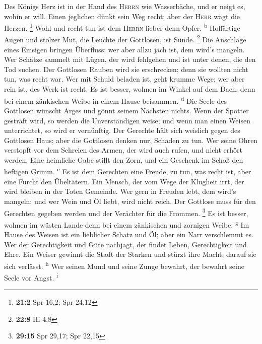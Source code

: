  Des Königs Herz ist in der Hand des \textsc{Herrn} wie
Wasserbäche, und er neigt es, wohin er will.  Einen
jeglichen dünkt sein Weg recht; aber der \textsc{Herr} wägt die Herzen.
\footnote{\textbf{21:2} Spr 16,2; Spr 24,12}  Wohl und
recht tun ist dem \textsc{Herrn} lieber denn Opfer. \textsuperscript{b}
 Hoffärtige Augen und stolzer Mut, die Leuchte der
Gottlosen, ist Sünde. \footnote{\textbf{22:8} Hi 4,8}  Die
Anschläge eines Emsigen bringen Überfluss; wer aber allzu jach ist, dem
wird's mangeln.  Wer Schätze sammelt mit Lügen, der wird
fehlgehen und ist unter denen, die den Tod suchen.  Der
Gottlosen Rauben wird sie erschrecken; denn sie wollten nicht tun, was
recht war.  Wer mit Schuld beladen ist, geht krumme Wege;
wer aber rein ist, des Werk ist recht.  Es ist besser,
wohnen im Winkel auf dem Dach, denn bei einem zänkischen Weibe in einem
Hause beisammen. \textsuperscript{d}  Die Seele des
Gottlosen wünscht Arges und gönnt seinem Nächsten nichts.
 Wenn der Spötter gestraft wird, so werden die
Unverständigen weise; und wenn man einen Weisen unterrichtet, so wird er
vernünftig.  Der Gerechte hält sich weislich gegen des
Gottlosen Haus; aber die Gottlosen denken nur, Schaden zu tun.
 Wer seine Ohren verstopft vor dem Schreien des Armen,
der wird auch rufen, und nicht erhört werden.  Eine
heimliche Gabe stillt den Zorn, und ein Geschenk im Schoß den heftigen
Grimm. \textsuperscript{e}  Es ist dem Gerechten eine
Freude, zu tun, was recht ist, aber eine Furcht den Übeltätern.
 Ein Mensch, der vom Wege der Klugheit irrt, der wird
bleiben in der Toten Gemeinde.  Wer gern in Freuden lebt,
dem wird's mangeln; und wer Wein und Öl liebt, wird nicht reich.
 Der Gottlose muss für den Gerechten gegeben werden und
der Verächter für die Frommen. \footnote{\textbf{29:15} Spr 29,17; Spr
  22,15}  Es ist besser, wohnen im wüsten Lande denn bei
einem zänkischen und zornigen Weibe. \textsuperscript{g} 
Im Hause des Weisen ist ein lieblicher Schatz und Öl; aber ein Narr
verschlemmt es.  Wer der Gerechtigkeit und Güte nachjagt,
der findet Leben, Gerechtigkeit und Ehre.  Ein Weiser
gewinnt die Stadt der Starken und stürzt ihre Macht, darauf sie sich
verlässt. \textsuperscript{h}  Wer seinen Mund und seine
Zunge bewahrt, der bewahrt seine Seele vor Angst. \textsuperscript{i}
